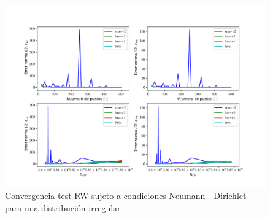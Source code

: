 \begin{figure}
    \centering
    \includegraphics[width=1\textwidth]{./Imagenes/06/comparacion_shp_irreg/RW_irreg_type-2_caso-3_direct_dgesv-lapack-blas_sme-v2_lme-v2_lme-v1_fwls.pdf}
    \caption{Convergencia test RW sujeto a condiciones Neumann - Dirichlet para una distribución irregular} \label{fig:RW_caso-3_conv}
\end{figure}


